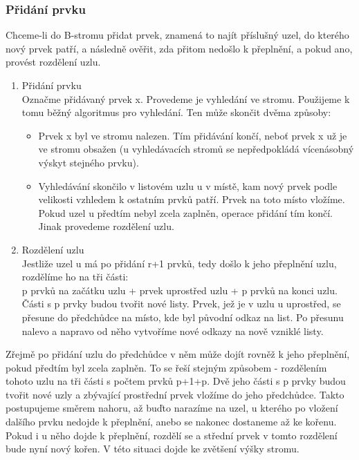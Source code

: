 \documentclass[10pt,a4paper]{article}
\begin{document}
\subsubsection{Přidání prvku}
Chceme-li do B-stromu přidat prvek, znamená to najít příslušný uzel, do kterého nový prvek patří, a následně ověřit, zda přitom nedošlo k přeplnění, a pokud ano, provést rozdělení uzlu.
\begin{enumerate}
	\item Přidání prvku \\
	Označme přidávaný prvek x. Provedeme je vyhledání ve stromu. Použijeme k tomu běžný algoritmus pro vyhledání. Ten může skončit dvěma způsoby:
	\begin{itemize}
		\item Prvek x byl ve stromu nalezen. Tím přidávání končí, neboť prvek x už je ve stromu obsažen (u vyhledávacích stromů se nepředpokládá vícenásobný výskyt stejného prvku).
		\item Vyhledávání skončilo v listovém uzlu u v místě, kam nový prvek podle velikosti vzhledem k ostatním prvků patří. Prvek na toto místo vložíme. Pokud uzel u předtím nebyl zcela zaplněn, operace přidání tím končí. Jinak provedeme rozdělení uzlu.
	\end{itemize}
	\item Rozdělení uzlu \\
	Jestliže uzel u má po přidání r+1 prvků, tedy došlo k jeho přeplnění uzlu, rozdělíme ho na tři části: \\
	p prvků na začátku uzlu + prvek uprostřed uzlu + p prvků na konci uzlu. \\
	Části s p prvky budou tvořit nové listy. Prvek, jež je v uzlu u uprostřed, se přesune do předchůdce na místo, kde byl původní odkaz na list. Po přesunu nalevo a napravo od něho vytvoříme nové odkazy na nově vzniklé listy.
\end{enumerate}
Zřejmě po přidání uzlu do předchůdce v něm může dojít rovněž k jeho přeplnění, pokud předtím byl zcela zaplněn. To se řeší stejným způsobem - rozdělením tohoto uzlu na tři části s počtem prvků p+1+p. Dvě jeho části s p prvky budou tvořit nové uzly a zbývající prostřední prvek vložíme do jeho předchůdce. Takto postupujeme směrem nahoru, až buďto narazíme na uzel, u kterého po vložení dalšího prvku nedojde k přeplnění, anebo se nakonec dostaneme až ke kořenu. Pokud i u něho dojde k přeplnění, rozdělí se a střední prvek v tomto rozdělení bude nyní nový kořen. V této situaci dojde ke zvětšení výšky stromu.
\end{document}

